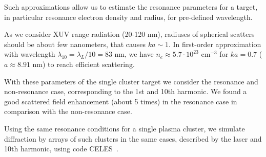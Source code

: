 \documentclass[conference]{IEEEtran}
\begin{document}
Such approximations allow us to estimate the resonance parameters for a target, in particular resonance electron density and radius, for pre-defined wavelength.

As we consider XUV range radiation (20-120 nm), radiuses of spherical scatters should be about few nanometers, that causes $ka \sim 1$. In first-order approximation with wavelength $\lambda_{10} = \lambda_{L} / 10 = 83$ nm, we have $n_e \approx 5.7 \cdot 10^{23}$ $\textrm{cm}^{-3}$ for $ka = 0.7$ ($a \approx 8.91$ nm) to reach efficient scattering.




With these parameters of the single cluster target we consider the resonance and non-resonance case, corresponding to the 1st and 10th harmonic. We found a good scattered field enhancement (about 5 times) in the resonance case in comparison with the non-resonance case.



Using the same resonance conditions for a single plasma cluster, we simulate diffraction by arrays of such clusters in the same cases, described by the laser and 10th harmonic, using code CELES~\cite{celes}. 




\end{document}
